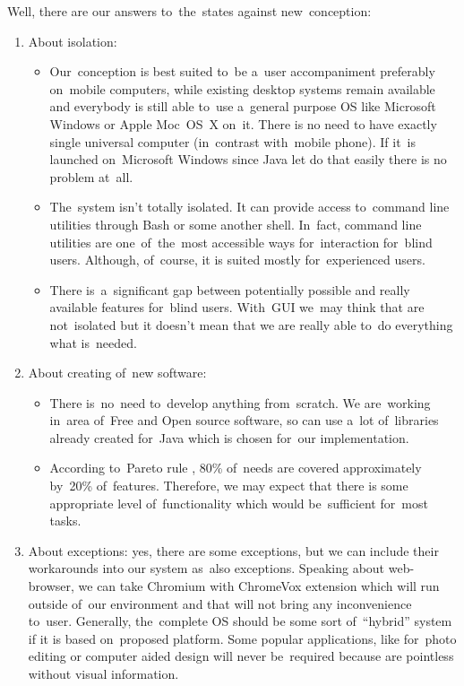 \documentclass{acm_proc_article-sp}
\begin{document}
Well, there are our answers to~the~states  against new~conception:

\begin{enumerate}

\item {About isolation:}
\begin{itemize}
\item {
Our~conception is best suited to~be a~user accompaniment preferably on~mobile computers,
while existing desktop systems remain available 
and everybody is still able to~use a~general purpose OS like Microsoft Windows or Apple Moc~OS~X on~it.
There is no need to have exactly single universal computer (in~contrast with~mobile phone).
If it~is launched on~Microsoft Windows since Java let do that easily 
there is no problem at~all.
}
\item {
The~system isn't totally isolated.
It can provide access to~command line utilities 
through Bash or some another shell.
In~fact, command line utilities are one~of~the~most accessible ways for~interaction for~blind users.
Although, of~course, it is suited mostly for~experienced users. 
}
\item {
There is~a~significant gap between potentially possible and really available features for~blind users.
With~GUI we~may think that are not~isolated but it doesn't mean that 
we are really able to~do everything what is~needed.
}
\end{itemize}

\item {About creating of~new software:}
\begin{itemize}
\item {
There is~no~need to~develop anything from~scratch.
We are~working in~area of~Free and Open source software,
so can use a~lot of~libraries already created for~Java which is chosen for~our implementation.
}
\item {
According to~Pareto rule \cite{pareto},
80\% of~needs are covered approximately by~20\% of~features.
Therefore, we may expect that there is some appropriate level of~functionality which would be~sufficient for~most tasks.
}
\end{itemize}

\item {About exceptions:
yes, there are some exceptions, but we can include their workarounds into our system as~also exceptions.
Speaking about web-browser, we can take Chromium \cite{chromium} with ChromeVox extension \cite{chromevox}
which will run outside of~our environment and that will not bring any inconvenience to~user.
Generally, the~complete OS should be some sort of~``hybrid'' system 
if it is based on~proposed platform. 
Some popular applications, like for~photo editing or computer aided design will never be~required 
because are pointless without visual information.
}
\end{enumerate}
\end{document}
